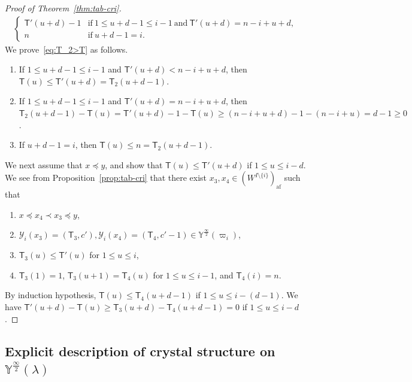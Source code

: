 \documentclass[10pt]{amsart}
\theoremstyle{definition}\newtheorem{defi}[theo]{Definition}
\theoremstyle{remark}\newtheorem{rema}[theo]{Remark}
\newcommand{\si}{\frac{\infty}{2}}
\DeclareMathOperator{\af}{af}
\begin{document}
\begin{proof}[Proof of Theorem~\ref{thm:tab-cri}]
\begin{multline}
\begin{cases}
\mathsf{T}'(u+d) -1
&
\text{if} \ 
1 \leq u+d-1 \leq i-1 \ 
\text{and} \ 
\mathsf{T}'(u+d) = n-i+u+d , \\%
n
&
\text{if} \ 
u+d-1 = i .
\end{cases}
\end{multline}
We prove~\eqref{eq:T_2>T} as follows. 
\begin{enumerate}[label=(\arabic*)]
\item
If
$1 \leq u+d-1 \leq i-1$ 
and 
$\mathsf{T}'(u+d) < n-i+u+d$, 
then 
$\mathsf{T}(u) \leq \mathsf{T}'(u+d) = \mathsf{T}_2(u+d-1)$. 
\item
If
$1 \leq u+d-1 \leq i-1$ 
and 
$\mathsf{T}'(u+d) = n-i+u+d$, 
then 
$\mathsf{T}_2(u+d-1) - \mathsf{T}(u) 
= 
\mathsf{T}'(u+d) - 1 - \mathsf{T}(u)
\geq 
(n-i+u+d) - 1 - (n-i+u)
= d - 1 \geq 0$.
\item
If 
$u+d-1 = i$, 
then 
$\mathsf{T}(u) \leq n = \mathsf{T}_2(u+d-1)$.
\end{enumerate}

We next assume that 
$x \preceq y$, 
and show that
$\mathsf{T}(u) \leq \mathsf{T}'(u+d)$ 
if 
$1 \leq u \leq i-d$. 
We see from Proposition~\ref{prop:tab-cri} that 
there exist 
$x_3 , x_4 \in (W^{I \setminus \{ i \}})_{\af}$ 
such that 
\begin{enumerate}[label=(\arabic*)]
\item
$x \preceq x_4 \prec x_3 \preceq y$, 
\item
$\mathcal{Y}_i(x_3) = (\mathsf{T}_3 , c') , \mathcal{Y}_i(x_4) = (\mathsf{T}_4 , c'-1) \in \mathbb{Y}^{\si}(\varpi_i)$, 
\item
$\mathsf{T}_3(u) \leq \mathsf{T}'(u)$ 
for 
$1 \leq u \leq i$, 
\item
$\mathsf{T}_3(1) = 1$, 
$\mathsf{T}_3(u+1) = \mathsf{T}_4(u)$ 
for 
$1 \leq u \leq i-1$, 
and 
$\mathsf{T}_4(i) = n$. 
\end{enumerate}
By induction hypothesis, 
$\mathsf{T}(u) \leq \mathsf{T}_4(u+d-1)$ 
if 
$1 \leq u \leq i - (d-1)$. 
We have 
$\mathsf{T}'(u+d) - \mathsf{T}(u) \geq \mathsf{T}_3(u+d) - \mathsf{T}_4(u+d-1) = 0$ 
if 
$1 \leq u \leq i-d$. 
\end{proof}

\subsection{Explicit description of crystal structure on \texorpdfstring{$\mathbb{Y}^{\si}(\lambda)$}{Y (infty/2)(lambda)}}
\end{document}
